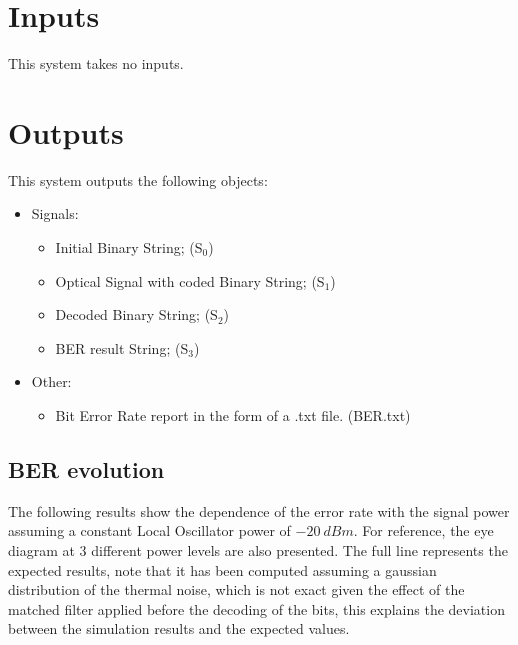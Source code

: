 \documentclass[a4paper]{article}
\begin{document}

\section{Inputs}

This system takes no inputs.

\section{Outputs}

This system outputs the following objects:
\begin{itemize}
\item Signals:
\begin{itemize}
\item Initial Binary String; (S$_0$)
\item Optical Signal with coded Binary String; (S$_{1}$)
\item Decoded Binary String; (S$_{2}$)
\item BER result String; (S$_{3}$)
\end{itemize}
\item Other:
\begin{itemize}
\item Bit Error Rate report in the form of a .txt file. (BER.txt)
\end{itemize}
\end{itemize}

\subsection{BER evolution}

The following results show the dependence of the error rate with the signal power assuming a constant Local Oscillator power of $-20~dBm$. For reference, the eye diagram at 3 different power levels are also presented. The full line represents the expected results, note that it has been computed assuming a gaussian distribution of the thermal noise, which is not exact given the effect of the matched filter applied before the decoding of the bits, this explains the deviation between the simulation results and the expected values.
\end{document}
